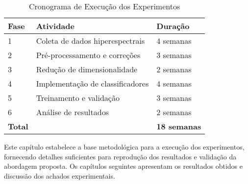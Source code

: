 \begin{table}[h]
\centering
\caption{Cronograma de Execução dos Experimentos}
\begin{tabular}{|l|l|l|}
\hline
\textbf{Fase} & \textbf{Atividade} & \textbf{Duração} \\
\hline
1 & Coleta de dados hiperespectrais & 4 semanas \\
2 & Pré-processamento e correções & 3 semanas \\
3 & Redução de dimensionalidade & 2 semanas \\
4 & Implementação de classificadores & 4 semanas \\
5 & Treinamento e validação & 3 semanas \\
6 & Análise de resultados & 2 semanas \\
\hline
\textbf{Total} & & \textbf{18 semanas} \\
\hline
\end{tabular}
\label{tab:cronograma}
\end{table}

Este capítulo estabelece a base metodológica para a execução dos experimentos, fornecendo detalhes suficientes para reprodução dos resultados e validação da abordagem proposta. Os capítulos seguintes apresentam os resultados obtidos e discussão dos achados experimentais.
